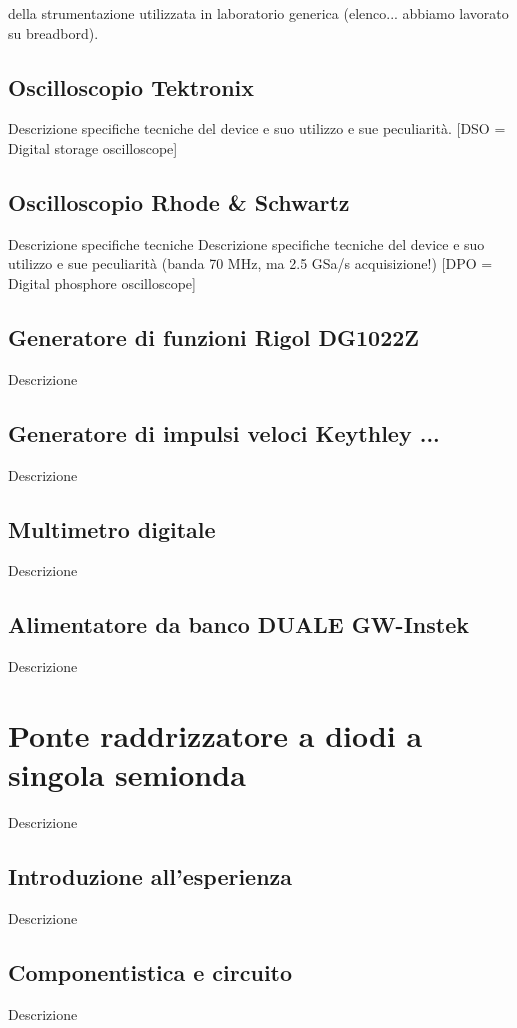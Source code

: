 \documentclass[journal]{IEEEtran}
\begin{document}
 della strumentazione utilizzata in laboratorio generica (elenco... abbiamo lavorato su breadbord).

\subsection{\textbf{Oscilloscopio Tektronix}}
Descrizione specifiche tecniche del device e suo utilizzo e sue peculiarità. [DSO = Digital storage oscilloscope]

\subsection{\textbf{Oscilloscopio Rhode & Schwartz}}
Descrizione specifiche tecniche 
Descrizione specifiche tecniche del device e suo utilizzo e sue peculiarità (banda 70 MHz, ma 2.5 GSa/s acquisizione!)
[DPO = Digital phosphore oscilloscope]

\subsection{\textbf{Generatore di funzioni Rigol DG1022Z}}
Descrizione

\subsection{\textbf{Generatore di impulsi veloci Keythley ...}}
Descrizione

\subsection{\textbf{Multimetro digitale}}
Descrizione

\subsection{\textbf{Alimentatore da banco DUALE GW-Instek}}
Descrizione

\section{\textbf{Ponte raddrizzatore a diodi a singola semionda}}
Descrizione

\subsection{\textbf{Introduzione all'esperienza}}
Descrizione

\subsection{\textbf{Componentistica e circuito}}
Descrizione
\end{document}
